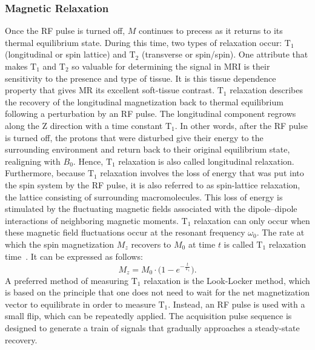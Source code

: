 \subsubsection{Magnetic Relaxation}
Once the RF pulse is turned off, $M$ continues to precess as it returns to its thermal equilibrium state. During this time, two types of relaxation occur: $\text{T}_1$ (longitudinal or spin lattice) and $\text{T}_2$ (transverse or spin/spin). One attribute that makes $\text{T}_1$ and $\text{T}_2$ so valuable for determining the signal in MRI is their sensitivity to the presence and type of tissue. It is this tissue dependence property that gives MR its excellent soft-tissue contrast. $\text{T}_1$ relaxation describes the recovery of the longitudinal magnetization back to thermal equilibrium following a perturbation by an RF pulse. The longitudinal component regrows along the Z direction with a time constant $\text{T}_1$. In other words, after the RF pulse is turned off, the protons that were disturbed give their energy to the surrounding environment and return back to their original equilibrium state, realigning with $B_0$. Hence, $\text{T}_1$ relaxation is also called longitudinal relaxation. Furthermore, because $\text{T}_1$ relaxation involves the loss of energy that was put into the spin system by the RF pulse, it is also referred to as spin-lattice relaxation, the lattice consisting of surrounding macromolecules. This loss of energy is stimulated by the fluctuating magnetic fields associated with the dipole–dipole interactions of neighboring magnetic moments. $\text{T}_1$ relaxation can only occur when these magnetic field fluctuations occur at the resonant frequency $\omega_0$. The rate at which the spin magnetization $M_z$ recovers to $M_0$ at time $t$ is called $\text{T}_1$ relaxation time~\cite{Serai2021}. It can be expressed as follows:
\begin{equation}
	M_z = M_0 \cdot \bigg(1 - e^{-\frac{t}{\text{T}_1}} \bigg).
\end{equation}
A preferred method of measuring $\text{T}_1$ relaxation is the Look-Locker method, which is based on the principle that one does not need to wait for the net magnetization vector to equilibrate in order to measure $\text{T}_1$. Instead, an RF pulse is used with a small flip, which can be repeatedly applied. The acquisition pulse sequence is designed to generate a train of signals that gradually approaches a steady-state recovery. 

